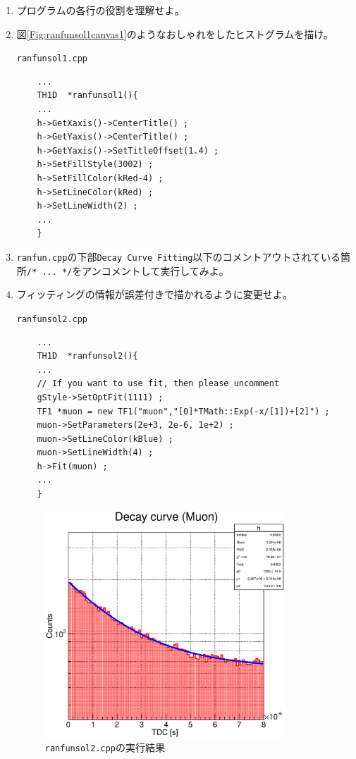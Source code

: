   \begin{enumerate}
   \item プログラムの各行の役割を理解せよ。

   \item 図\ref{Fig:ranfunsol1canvas1}のようなおしゃれをしたヒストグラムを描け。
	 \begin{itembox}{\texttt{ranfunsol1.cpp}}
\begin{verbatim}
	...
	TH1D  *ranfunsol1(){ 
	...
	h->GetXaxis()->CenterTitle() ;
	h->GetYaxis()->CenterTitle() ;
	h->GetYaxis()->SetTitleOffset(1.4) ;
	h->SetFillStyle(3002) ;
	h->SetFillColor(kRed-4) ;
	h->SetLineColor(kRed) ;
	h->SetLineWidth(2) ;
	...
	}
\end{verbatim}
	 \end{itembox}

   \item \verb|ranfun.cpp|の下部\verb|Decay Curve Fitting|以下のコメントアウトされている箇所\verb|/* ... */|をアンコメントして実行してみよ。

   \item フィッティングの情報が誤差付きで描かれるように変更せよ。
	 \begin{itembox}{\texttt{ranfunsol2.cpp}}
\begin{verbatim}
	...
	TH1D  *ranfunsol2(){ 
	...
	// If you want to use fit, then please uncomment
	gStyle->SetOptFit(1111) ;
	TF1 *muon = new TF1("muon","[0]*TMath::Exp(-x/[1])+[2]") ;
	muon->SetParameters(2e+3, 2e-6, 1e+2) ;
	muon->SetLineColor(kBlue) ;
	muon->SetLineWidth(4) ;
	h->Fit(muon) ;
	...
	}
\end{verbatim}
	 \end{itembox}
	 \begin{figure}[htbp]
	  \begin{center}
	   \includegraphics[width = 90mm]{./picture/ranfunsol2canvas1.eps}
	  \end{center}
	  \caption{\texttt{ranfunsol2.cpp}の実行結果}
	  \label{Fig:ranfunsol2canvas1}
	 \end{figure}

  \end{enumerate}
